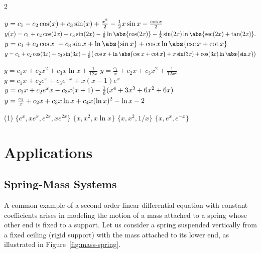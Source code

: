 \begin{multicols}{2}\scriptsize
	\begin{Answer}[ref={EX35}]
		\Question \label{4-4-1a}
		\begin{tasks}
			\task \(y= c_1-c_2 \cos (x)+c_3 \sin (x)\\+ \frac{x^2}{2}-\frac{1}{2} x \sin x-\frac{\cos x}{2}\)
			\task \(y(x) = c_1 + c_2 \cos(2x)\\ + c_3 \sin(2x)
			- \frac{1}{8} \ln\abs{\cos(2x)}\\
			- \frac{1}{8} \sin(2x) \ln\abs{\sec(2x) + \tan(2x)}.
			 \)
			 \task \(y=c_1 + c_2 \cos x\ + c_3 \sin x+ \ln\abs{\sin x}+\cos x\ln\abs{\csc x+ \cot x}\)
			 \task \(y= c_1 + c_2 \cos (3x) + c_3 \sin (3x)-\frac19\big(\cos x + \ln\abs{\csc x + \cot x} + x \sin(3x) \\+ \cos(3x) \ln\abs{\sin x}\big)\)
		\end{tasks} 
		
		\Question \label{4-4-2a}
		\begin{tasks}
			\task \(y= c_1 x  + c_2x^2  + c_3x \ln x + \frac{1}{12x}\)
			\task \(y=  \frac{c_1}{x} + c_2x  + c_3x^2+ \frac{1}{12 x^2}\)
			\task \(y=c_1x+ c_2e^x+c_3e^{-x}+ x(x-1)e^x \)
			\task \(y =  c_1 x+c_2 e^x x-c_3 x (x+1)\\-\frac{1}{6} (x^4+3 x^3+6 x^2+6 x)\)
			\task \(y = \frac{c_1}{x}+c_2 x+c_3 x\ln x+c_4 x (\ln x)^2\\- \ln x-2\)
		\end{tasks} 
		\Question\label{4-4-3a} 
		\begin{tasks}(1)
			\task \( \{e^x, xe^x, e^{2x}, xe^{2x}\}\)
			\task \(\{x, x^2, x \ln x\}\)
			\task \(\{x, x^2, 1/x\}\)
			\task \(\{x, e^x, e^{-x}\}\)
		\end{tasks}
		
	\end{Answer}
\end{multicols}


\section{Applications} 


\subsection{Spring-Mass Systems}\label{subsection:spring-mass}
A common example of a second order linear differential equation with constant coefficients arises in modeling the motion of a mass  attached to a spring whose other end is fixed to a support.  Let us consider a spring suspended vertically from a fixed ceiling (rigid support) with the mass attached to its lower end, as illustrated in Figure~\ref{fig:mass-spring}. 

